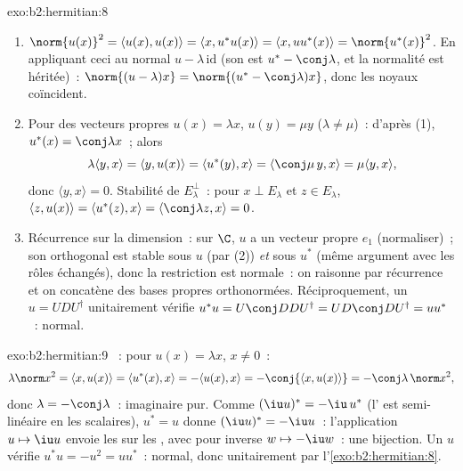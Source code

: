 \begin{solution}{exo:b2:hermitian:8}
\begin{enumerate}
  \item $\norm{u(x)}^2 = \langle u(x), u(x)\rangle = \langle x,
        u^*u(x)\rangle = \langle x, uu^*(x)\rangle =
        \norm{u^*(x)}^2$. En appliquant ceci au normal $u -
        \lambda\,\mathrm{id}$ (son  est $u^* -
        \conj\lambda$, et la normalité est héritée)~: $\norm{(u -
        \lambda)x} = \norm{(u^* - \conj\lambda)x}$, donc les noyaux
        coïncident.
  \item Pour des vecteurs propres $u(x) = \lambda x$, $u(y) = \mu y$
        ($\lambda \neq \mu$)~: d'après (1), $u^*(x) = \conj\lambda x$~;
        alors
        \[
        \lambda\langle y, x\rangle = \langle y, u(x)\rangle
        = \langle u^*(y), x\rangle = \langle \conj\mu\, y, x\rangle
        = \mu \langle y, x\rangle ,
        \]
        donc $\langle y, x\rangle = 0$. Stabilité de $E_\lambda^\perp$~:
        pour $x \perp E_\lambda$ et $z \in E_\lambda$, $\langle z,
        u(x)\rangle = \langle u^*(z), x\rangle =
        \langle\conj\lambda z, x\rangle = 0$.
  \item Récurrence sur la dimension~: sur $\C$, $u$ a un vecteur propre
        $e_1$ (normaliser)~; son orthogonal est stable
        sous $u$ (par (2)) \emph{et} sous $u^*$ (même argument
        avec les rôles échangés), donc la restriction est normale~:
        on raisonne par récurrence et on concatène des bases propres
        orthonormées. Réciproquement, un $u = UDU^\dagger$
        unitairement  vérifie $u^*u
        = U\conj D D U^\dagger = U D\conj D U^\dagger = uu^*$~:
        normal.
\end{enumerate}
\end{solution}

\begin{solution}{exo:b2:hermitian:9}
~: pour $u(x) = \lambda x$, $x \neq 0$~:
\[
\lambda\norm x^2 = \langle x, u(x)\rangle
= \langle u^*(x), x\rangle = -\langle u(x), x\rangle
= -\conj{\langle x, u(x)\rangle} = -\conj\lambda\,\norm x^2 ,
\]
donc $\lambda = -\conj\lambda$~: imaginaire pur. Comme $(\iu
u)^* = -\iu\,u^*$ (l' est semi-linéaire en les scalaires),
$u^* = u$ donne $(\iu u)^* = -\iu u$~: l'application $u \mapsto \iu u$
envoie les  sur les , avec pour inverse $w
\mapsto -\iu w$~: une bijection. Un $u$  vérifie $u^*u =
-u^2 = uu^*$~: normal, donc unitairement  par
l'\cref{exo:b2:hermitian:8}.
\end{solution}

